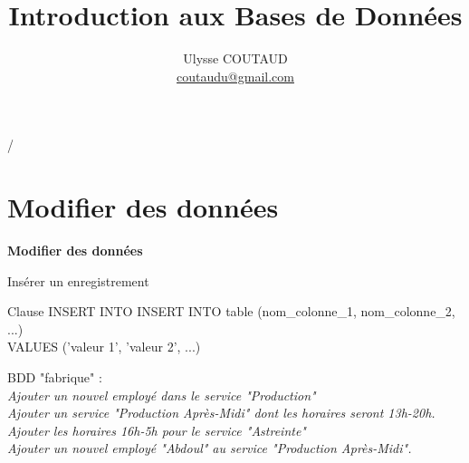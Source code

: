 \documentclass[xetex,dvipsnames]{beamer}
\begin{document}
\title{Introduction aux Bases de Données}

 {   \hspace{1em} \insertframenumber/\inserttotalframenumber }

\author{Ulysse COUTAUD\\\href{mailto:coutaudu@gmail.com}{\small coutaudu@gmail.com}}
\date{}
	
\maketitle

\section{Modifier des données}
\begin{frame}
\begin{center}
{\LARGE \textbf{Modifier des données}}
\end{center}
\end{frame}

\begin{frame}[t]{Insérer un enregistrement}
	
	\begin{alertblock}{Clause INSERT INTO}
	INSERT INTO table (nom\_colonne\_1, nom\_colonne\_2, ...) \\VALUES ('valeur 1', 'valeur 2', ...)
	\end{alertblock}
		
	\begin{scriptsize}
	\vspace{1em}
	BDD "fabrique" :\\
	\vspace{0.5em}
	\textit{Ajouter un nouvel employé dans le service "Production"}\\
	\textit{Ajouter un service "Production Après-Midi" dont les horaires seront 13h-20h.}\\
	\textit{Ajouter les horaires 16h-5h pour le service "Astreinte"}\\
	\textit{Ajouter un nouvel employé "Abdoul" au service "Production Après-Midi".}\\
	\end{scriptsize}
\end{frame}
\end{document}
